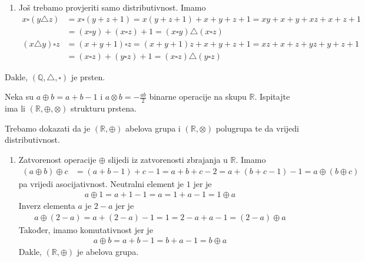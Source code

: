 \documentclass{exam}
\begin{document}
\begin{questions}
\begin{solution}
\begin{enumerate}
    \item Još trebamo provjeriti samo distributivnost. Imamo
      \begin{align*}
        x \square (y \triangle z) &= x \square (y + z + 1) = x(y + z + 1) + x + y + z + 1 = xy + x + y + xz + x + z + 1\\
        &= (x \square y) + (x \square z) + 1 = (x \square y) \triangle (x \square z)
      \end{align*}
      \begin{align*}
        (x \triangle y) \square z &= (x + y + 1) \square z = (x + y + 1)z + x + y + z + 1 = xz + x + z + yz + y + z + 1\\
        &= (x \square z) + (y \square z) + 1 = (x \square z) \triangle (y \square z)
      \end{align*}
  \end{enumerate}
  Dakle, $(\mathbb{Q}, \triangle, \square)$ je prsten.
\end{solution}

\pagebreak

\question Neka su $a \oplus b = a + b - 1$ i $a \otimes b = -\frac{ab}{2}$ binarne operacije na skupu $\mathbb{R}$. Ispitajte ima li $(\mathbb{R}, \oplus, \otimes)$ strukturu prstena.

\begin{solution}
  Trebamo dokazati da je $(\mathbb{R}, \oplus)$ abelova grupa i $(\mathbb{R}, \otimes)$ polugrupa te da vrijedi distributivnost.
  \begin{enumerate}
    \item Zatvorenost operacije $\oplus$ slijedi iz zatvorenosti zbrajanja u $\mathbb{R}$. Imamo
      \begin{align*}
        (a \oplus b) \oplus c &= (a + b - 1) + c - 1 = a + b + c - 2 = a + (b + c - 1) - 1 = a \oplus (b \oplus c)
      \end{align*}
      pa vrijedi asocijativnost. Neutralni element je $1$ jer je
      \begin{align*}
        a \oplus 1 = a + 1 - 1 = a = 1 + a - 1 = 1 \oplus a
      \end{align*}
      Inverz elementa $a$ je $2-a$ jer je
      \begin{align*}
        a \oplus (2 - a) = a + (2 - a) - 1 = 1 = 2 - a + a - 1 = (2 - a) \oplus a
      \end{align*}
      Također, imamo komutativnost jer je
      \begin{align*}
        a \oplus b = a + b - 1 = b + a - 1 = b \oplus a
      \end{align*}
      Dakle, $(\mathbb{R}, \oplus)$ je abelova grupa.


\end{enumerate}
\end{solution}
\end{questions}
\end{document}
